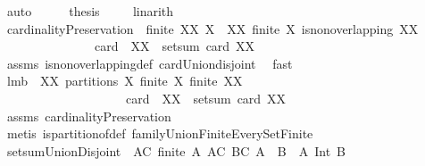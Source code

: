 \begin{isabellebody}
\ auto\isanewline
\ \ \isamarkupfalse%
\ \isamarkupfalse%
\ {\isacharquery}thesis\ \isamarkupfalse%
\ {}\ \isamarkupfalse%
\ linarith\isanewline
{}\isamarkupfalse%
%
\endisatagproof
{\isafoldproof}%
%
\isadelimproof
\isanewline
%
\endisadelimproof
\isanewline
{}\isamarkupfalse%
\ cardinalityPreservation{\isacharcolon}\ \ {\isachardoublequoteopen}finite\ XX{\isachardoublequoteclose}\ {\isachardoublequoteopen}{\isasymforall}X\ {\isasymin}\ XX{\isachardot}\ finite\ X{\isachardoublequoteclose}\ {\isachardoublequoteopen}is{\isacharunderscore}non{\isacharunderscore}overlapping\ XX{\isachardoublequoteclose}\ \isanewline
\ \ \ \ \ \ \ \ \ \ \ \ \ \ \ {\isachardoublequoteopen}card\ {\isacharparenleft}{\isasymUnion}\ XX{\isacharparenright}\ {\isacharequal}\ setsum\ card\ XX{\isachardoublequoteclose}\ \isanewline
%
\isadelimproof
\ \ \ \ \ \ \ \ \ \ \ \ %
\endisadelimproof
%
\isatagproof
{}\isamarkupfalse%
\ assms\ is{\isacharunderscore}non{\isacharunderscore}overlapping{\isacharunderscore}def\ card{\isacharunderscore}Union{\isacharunderscore}disjoint\ \isamarkupfalse%
\ fast%
\endisatagproof
{\isafoldproof}%
%
\isadelimproof
\isanewline
%
\endisadelimproof
\isanewline
{}\isamarkupfalse%
\ lm{}{}b{\isacharcolon}\ \ {\isachardoublequoteopen}XX\ partitions\ X{\isachardoublequoteclose}\ {\isachardoublequoteopen}finite\ X{\isachardoublequoteclose}\ {\isachardoublequoteopen}finite\ XX{\isachardoublequoteclose}\ \isanewline
\ \ \ \ \ \ \ \ \ \ \ \ \ \ \ \ \ \ \ \ {\isachardoublequoteopen}card\ {\isacharparenleft}{\isasymUnion}\ XX{\isacharparenright}\ {\isacharequal}\ setsum\ card\ XX{\isachardoublequoteclose}\ \isanewline
%
\isadelimproof
\ \ \ \ \ \ \ \ \ \ \ \ \ \ \ \ \ %
\endisadelimproof
%
\isatagproof
{}\isamarkupfalse%
\ assms\ cardinalityPreservation\ \isamarkupfalse%
\ {\isacharparenleft}metis\ is{\isacharunderscore}partition{\isacharunderscore}of{\isacharunderscore}def\ familyUnionFiniteEverySetFinite{\isacharparenright}%
\endisatagproof
{\isafoldproof}%
%
\isadelimproof
\isanewline
%
\endisadelimproof
\isanewline
\isanewline
{}\isamarkupfalse%
\ setsumUnionDisjoint{}{\isacharcolon}\ \ {\isachardoublequoteopen}{\isasymforall}A{\isasymin}C{\isachardot}\ finite\ A{\isachardoublequoteclose}\ {\isachardoublequoteopen}{\isasymforall}A{\isasymin}C{\isachardot}\ {\isasymforall}B{\isasymin}C{\isachardot}\ A\ {\isasymnoteq}\ B\ {\isasymlongrightarrow}\ A\ Int\ B\ {\isacharequal}\ {\isacharbraceleft}{\isacharbraceright}{\isachardoublequoteclose}\ \isanewline

\end{isabellebody}
